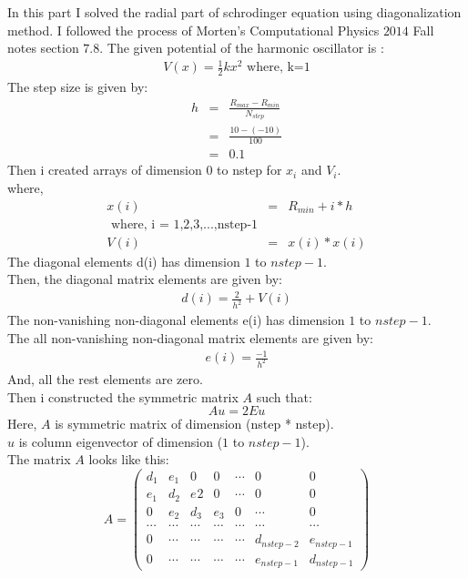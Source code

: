 \documentclass[11pt,a4paper,english]{article}
\newcommand{\no}{\nonumber}
\newcommand{\beqa}{\begin{eqnarray}}
\newcommand{\eeqa}{\end{eqnarray}}
\newcommand{\bdm}{\begin{displaymath}}
\newcommand{\edm}{\end{displaymath}}
\begin{document}
    In this part I solved the radial part of schrodinger equation using diagonalization method.
    I followed the process of Morten's Computational Physics $2014$ Fall notes section $7.8$.
    The given potential of the harmonic oscillator is :\\
    \beqa
    V(x)=\frac{1}{2}kx^{2}
    \text{  where, k=1}
    \eeqa
    The step size is given by:\\
    \beqa
    h&=&\frac{ R_{max} - R_{min} } {N_{step}}\\
    &=&\frac{ 10 - (-10) } {100}\no\\
    &=& 0.1\no   
    \eeqa
    Then i created arrays of dimension $0$ to nstep for $x_{i}$ and $V_{i}$.\\
    where,\\
    \beqa
    x(i) &=& R_{min} + i * h\\
    \text{ where, i = 1,2,3,...,nstep-1}\no\\
    V(i)&=& x(i) * x(i)    
    \eeqa
    The diagonal elements d(i) has dimension $1$ to $nstep-1$.\\
    Then, the diagonal matrix elements are given by:\\
    \beqa
    d(i)=\frac{2}{h^{2}} + V(i)
    \eeqa
    The non-vanishing non-diagonal elements e(i) has dimension $1$ to $nstep-1$.\\
    The all non-vanishing non-diagonal matrix elements are given by:\\
    \beqa
    e(i)=\frac{-1}{h^{2}}
    \eeqa
    And, all the rest elements are zero.\\
    Then i constructed the symmetric matrix $A$ such that:\\
    \bdm
    Au = 2E u
    \edm
    Here, $A$ is symmetric matrix of dimension (nstep * nstep).\\
    $u$ is column eigenvector of dimension ($1$ to $nstep-1$).\\
    The matrix $A$ looks like this:\\
    \begin{displaymath}
    A = 
 	\begin{pmatrix}
 	 	d_{1}   & e_{1}   & 0         & 0      & \cdots   & 0            & 0 \\
	 	e_{1}   & d_{2}   & e_{}2     & 0      & \cdots   & 0            & 0 \\
	 	0       & e_{2}   & d_{3}     & e_{3}  & 0        & \cdots       & 0 \\
	 	\cdots  & \cdots  & \cdots    & \cdots &\cdots    & \cdots       & \cdots  \\
	 	0       & \cdots  & \cdots    & \cdots & \cdots   & d_{nstep-2}  & e_{nstep-1} \\
	 	0       & \cdots  &\cdots     & \cdots & \cdots   & e_{nstep-1}  & d_{nstep-1} 
 	\end{pmatrix}
    \end{displaymath}
\end{document}

